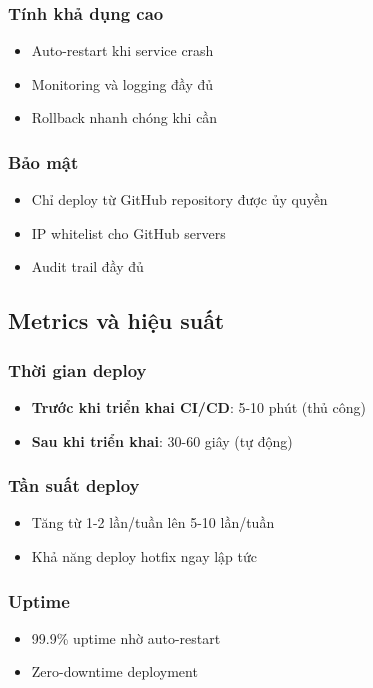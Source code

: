 \documentclass[12pt,a4paper]{article}
\begin{document}
\subsubsection{Tính khả dụng cao}
\begin{itemize}
    \item Auto-restart khi service crash
    \item Monitoring và logging đầy đủ
    \item Rollback nhanh chóng khi cần
\end{itemize}

\subsubsection{Bảo mật}
\begin{itemize}
    \item Chỉ deploy từ GitHub repository được ủy quyền
    \item IP whitelist cho GitHub servers
    \item Audit trail đầy đủ
\end{itemize}

\subsection{Metrics và hiệu suất}

\subsubsection{Thời gian deploy}
\begin{itemize}
    \item \textbf{Trước khi triển khai CI/CD}: 5-10 phút (thủ công)
    \item \textbf{Sau khi triển khai}: 30-60 giây (tự động)
\end{itemize}

\subsubsection{Tần suất deploy}
\begin{itemize}
    \item Tăng từ 1-2 lần/tuần lên 5-10 lần/tuần
    \item Khả năng deploy hotfix ngay lập tức
\end{itemize}

\subsubsection{Uptime}
\begin{itemize}
    \item 99.9\% uptime nhờ auto-restart
    \item Zero-downtime deployment
\end{itemize}
\end{document}
